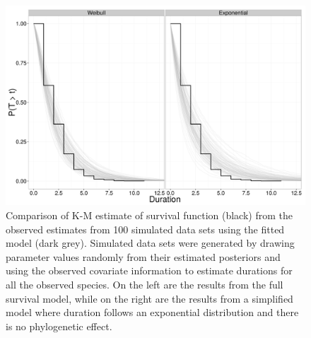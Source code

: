 \documentclass[12pt]{article}
\begin{document}

\clearpage


\begin{figure}[ht]
  \centering
  \includegraphics[height = 0.5\textheight, width = \textwidth, keepaspectratio = true]{figure/survival_function}
  \caption{Comparison of K-M estimate of survival function (black) from the observed estimates from 100 simulated data sets using the fitted model (dark grey). Simulated data sets were generated by drawing parameter values randomly from their estimated posteriors and using the observed covariate information to estimate durations for all the observed species. On the left are the results from the full survival model, while on the right are the results from a simplified model where duration follows an exponential distribution and there is no phylogenetic effect.}
  \label{fig:ppc_surv}
\end{figure}
\end{document}
